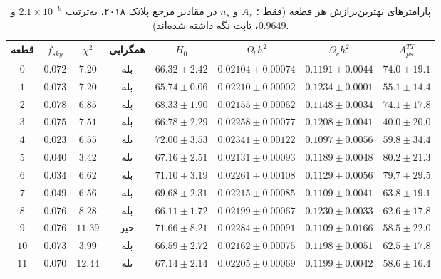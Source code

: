 \documentclass[14pt]{extarticle}
\begin{document}
\begin{table}[htbp]
    \centering
    \small
    \caption{پارامترهای بهترین‌برازش هر قطعه (فقط ؛ $A_s$ و $n_s$ در
    مقادیر مرجع پلانک ۲۰۱۸، به‌ترتیب $2.1\times10^{-9}$ و $0.9649$، ثابت
    نگه داشته شده‌اند).}
    \label{tab:params}
    \begin{tabular}{cccccccc}
        \toprule
        قطعه & $f_{sky}$ & $\chi^2$ & همگرایی & $H_0$ & $\Omega_b h^2$ & $\Omega_c h^2$ & $A_{ps}^{TT}$ \\
        \midrule
        $0$  & $0.072$ & $7.20$  & بله & $66.32 \pm 2.42$ & $0.02104 \pm 0.00074$ & $0.1191 \pm 0.0044$ & $74.0 \pm 19.1$ \\
        $1$  & $0.073$ & $7.20$  & بله & $65.74 \pm 0.06$ & $0.02210 \pm 0.00002$ & $0.1234 \pm 0.0001$ & $55.1 \pm 14.4$ \\
        $2$  & $0.078$ & $6.85$  & بله & $68.33 \pm 1.90$ & $0.02155 \pm 0.00062$ & $0.1148 \pm 0.0034$ & $74.1 \pm 17.8$ \\
        $3$  & $0.075$ & $7.51$  & بله & $66.78 \pm 2.29$ & $0.02258 \pm 0.00077$ & $0.1208 \pm 0.0041$ & $40.0 \pm 20.0$ \\
        $4$  & $0.023$ & $6.55$  & بله & $72.00 \pm 3.53$ & $0.02341 \pm 0.00122$ & $0.1097 \pm 0.0056$ & $59.8 \pm 34.4$ \\
        $5$  & $0.040$ & $3.42$  & بله & $67.16 \pm 2.51$ & $0.02131 \pm 0.00093$ & $0.1189 \pm 0.0048$ & $80.2 \pm 21.3$ \\
        $6$  & $0.034$ & $6.62$  & بله & $71.10 \pm 3.19$ & $0.02261 \pm 0.00108$ & $0.1129 \pm 0.0056$ & $79.7 \pm 29.5$ \\
        $7$  & $0.049$ & $6.56$  & بله & $69.68 \pm 2.31$ & $0.02215 \pm 0.00085$ & $0.1109 \pm 0.0041$ & $63.8 \pm 19.1$ \\
        $8$  & $0.076$ & $8.28$  & بله & $66.11 \pm 1.72$ & $0.02199 \pm 0.00067$ & $0.1230 \pm 0.0033$ & $62.6 \pm 17.8$ \\
        $9$  & $0.076$ & $11.39$ & خیر & $71.66 \pm 8.21$ & $0.02284 \pm 0.00091$ & $0.1109 \pm 0.0166$ & $58.5 \pm 22.0$ \\
        $10$ & $0.073$ & $3.99$  & بله & $66.59 \pm 2.72$ & $0.02162 \pm 0.00075$ & $0.1198 \pm 0.0051$ & $62.5 \pm 17.8$ \\
        $11$ & $0.070$ & $12.44$ & بله & $67.14 \pm 2.14$ & $0.02205 \pm 0.00069$ & $0.1199 \pm 0.0042$ & $58.6 \pm 16.4$ \\
        \bottomrule
    \end{tabular}
\end{table}
\end{document}
